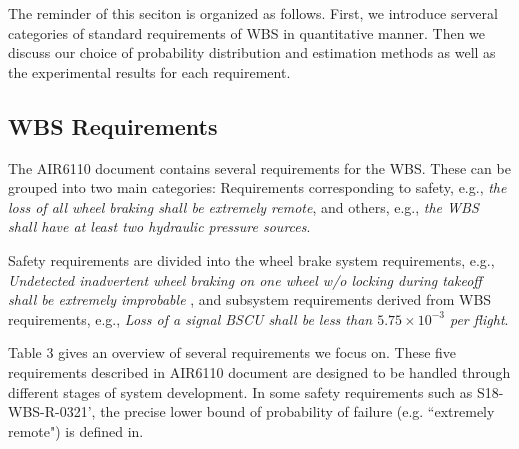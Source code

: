 The reminder of this seciton is organized as follows. First, we introduce serveral categories of standard requirements of WBS in quantitative manner. Then we discuss our choice of probability distribution and estimation methods as well as the experimental results for each requirement.

\subsection{WBS Requirements}
The AIR6110 document contains several requirements for the WBS. These can be grouped into two main categories: Requirements corresponding to safety, e.g., \emph{the loss of all wheel braking shall be extremely remote}, and others, e.g., \emph{the WBS shall have at least two hydraulic pressure sources}.

Safety requirements are divided into the wheel brake system requirements, e.g., \emph{Undetected inadvertent wheel braking on one wheel w/o locking during takeoff shall be extremely improbable
}, and subsystem requirements derived from WBS requirements, e.g., \emph{Loss of a signal BSCU shall be less than $5.75\times10^{-3}$ per flight}.

Table 3 gives an overview of several requirements we focus on. These five requirements described in AIR6110 document are designed to be handled through different stages of system development. In some safety requirements such as S18-WBS-R-0321', the precise lower bound of probability of failure (e.g. ``extremely remote") is defined in\cite{ac}.


